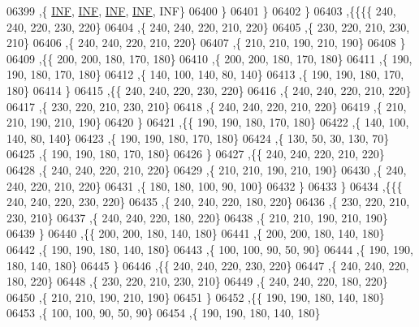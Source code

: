 \begin{DoxyCode}
06399     ,\{   \hyperlink{constants_8h_a12c2040f25d8e3a7b9e1c2024c618cb6}{INF},   \hyperlink{constants_8h_a12c2040f25d8e3a7b9e1c2024c618cb6}{INF},   \hyperlink{constants_8h_a12c2040f25d8e3a7b9e1c2024c618cb6}{INF},   \hyperlink{constants_8h_a12c2040f25d8e3a7b9e1c2024c618cb6}{INF},   INF\}
06400     \}
06401    \}
06402   \}
06403  ,\{\{\{\{   240,   240,   220,   230,   220\}
06404     ,\{   240,   240,   220,   210,   220\}
06405     ,\{   230,   220,   210,   230,   210\}
06406     ,\{   240,   240,   220,   210,   220\}
06407     ,\{   210,   210,   190,   210,   190\}
06408     \}
06409    ,\{\{   200,   200,   180,   170,   180\}
06410     ,\{   200,   200,   180,   170,   180\}
06411     ,\{   190,   190,   180,   170,   180\}
06412     ,\{   140,   100,   140,    80,   140\}
06413     ,\{   190,   190,   180,   170,   180\}
06414     \}
06415    ,\{\{   240,   240,   220,   230,   220\}
06416     ,\{   240,   240,   220,   210,   220\}
06417     ,\{   230,   220,   210,   230,   210\}
06418     ,\{   240,   240,   220,   210,   220\}
06419     ,\{   210,   210,   190,   210,   190\}
06420     \}
06421    ,\{\{   190,   190,   180,   170,   180\}
06422     ,\{   140,   100,   140,    80,   140\}
06423     ,\{   190,   190,   180,   170,   180\}
06424     ,\{   130,    50,    30,   130,    70\}
06425     ,\{   190,   190,   180,   170,   180\}
06426     \}
06427    ,\{\{   240,   240,   220,   210,   220\}
06428     ,\{   240,   240,   220,   210,   220\}
06429     ,\{   210,   210,   190,   210,   190\}
06430     ,\{   240,   240,   220,   210,   220\}
06431     ,\{   180,   180,   100,    90,   100\}
06432     \}
06433    \}
06434   ,\{\{\{   240,   240,   220,   230,   220\}
06435     ,\{   240,   240,   220,   180,   220\}
06436     ,\{   230,   220,   210,   230,   210\}
06437     ,\{   240,   240,   220,   180,   220\}
06438     ,\{   210,   210,   190,   210,   190\}
06439     \}
06440    ,\{\{   200,   200,   180,   140,   180\}
06441     ,\{   200,   200,   180,   140,   180\}
06442     ,\{   190,   190,   180,   140,   180\}
06443     ,\{   100,   100,    90,    50,    90\}
06444     ,\{   190,   190,   180,   140,   180\}
06445     \}
06446    ,\{\{   240,   240,   220,   230,   220\}
06447     ,\{   240,   240,   220,   180,   220\}
06448     ,\{   230,   220,   210,   230,   210\}
06449     ,\{   240,   240,   220,   180,   220\}
06450     ,\{   210,   210,   190,   210,   190\}
06451     \}
06452    ,\{\{   190,   190,   180,   140,   180\}
06453     ,\{   100,   100,    90,    50,    90\}
06454     ,\{   190,   190,   180,   140,   180\}

\end{DoxyCode}
